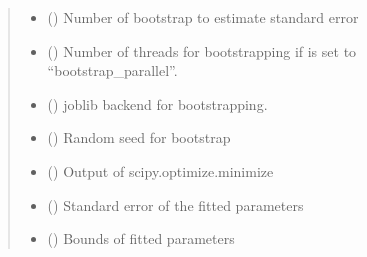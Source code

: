 \documentclass[letterpaper,10pt,english]{sphinxmanual}
\begin{document}
\begin{fulllineitems}
\begin{fulllineitems}
\begin{quote}
\begin{description}
\begin{itemize}
\item {}
\sphinxAtStartPar
{} () \textendash{} Number of bootstrap to estimate standard error

\item {}
\sphinxAtStartPar
{} () \textendash{} Number of threads for bootstrapping if  is set to
“bootstrap\_parallel”.

\item {}
\sphinxAtStartPar
{} () \textendash{} joblib backend for bootstrapping.

\item {}
\sphinxAtStartPar
{} () \textendash{} Random seed for bootstrap

\end{itemize}

\sphinxAtStartPar
{}

\sphinxAtStartPar
\begin{itemize}
\item {}
\sphinxAtStartPar
{} () \textendash{} Output of scipy.optimize.minimize

\item {}
\sphinxAtStartPar
{} () \textendash{} Standard error of the fitted parameters

\item {}
\sphinxAtStartPar
{} () \textendash{} Bounds of fitted parameters

\end{itemize}


\end{description}\end{quote}


\end{fulllineitems}
\end{fulllineitems}
\end{document}
